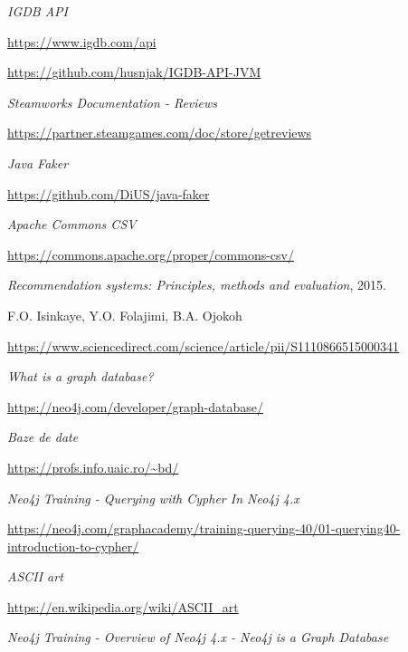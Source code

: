 \documentclass[12pt,a4paper]{report}
\begin{document}
\renewcommand\bibname{Bibliografie}
\begin{thebibliography}{9}

  
  \textit{IGDB API}
  
  \url{https://www.igdb.com/api}
  
  \url{https://github.com/husnjak/IGDB-API-JVM}
  
  
  \textit{Steamworks Documentation - Reviews}
  
  \url{https://partner.steamgames.com/doc/store/getreviews}
  
  
  \textit{Java Faker}
  
  \url{https://github.com/DiUS/java-faker}
  
  
  \textit{Apache Commons CSV}
  
  \url{https://commons.apache.org/proper/commons-csv/}


  
  \textit{Recommendation systems: Principles, methods and evaluation},
  2015.
  
  F.O. Isinkaye, Y.O. Folajimi, B.A. Ojokoh
  
  \url{https://www.sciencedirect.com/science/article/pii/S1110866515000341}
  
  
  \textit{What is a graph database?}
  
  \url{https://neo4j.com/developer/graph-database/}
  
  
  \textit{Baze de date}
  
  \url{https://profs.info.uaic.ro/~bd/}
  
  
  \textit{Neo4j Training - Querying with Cypher In Neo4j 4.x}
  
  \url{https://neo4j.com/graphacademy/training-querying-40/01-querying40-introduction-to-cypher/}
  
  
  \textit{ASCII art}
  
  \url{https://en.wikipedia.org/wiki/ASCII_art}
  
  
  \textit{Neo4j Training - Overview of Neo4j 4.x - Neo4j is a Graph Database  }
  

\end{thebibliography}
\end{document}
